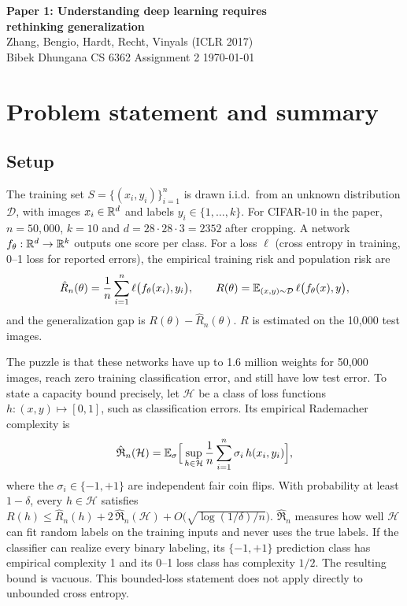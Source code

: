 

\begin{center}
  {\LARGE\bfseries Paper 1: Understanding deep learning requires\\[2pt] rethinking generalization}\\[5pt]
  {\large Zhang, Bengio, Hardt, Recht, Vinyals (ICLR 2017)}\\[4pt]
  Bibek Dhungana \quad\textbar\quad CS 6362 Assignment 2 \quad\textbar\quad \today
\end{center}

\section{Problem statement and summary}

\subsection{Setup}
The training set $S=\{(x_i,y_i)\}_{i=1}^n$ is drawn i.i.d.\ from an unknown distribution $\mathcal D$, with images $x_i\in\mathbb{R}^d$ and labels $y_i\in\{1,\dots,k\}$. For CIFAR-10 in the paper, $n=50{,}000$, $k=10$ and $d=28\cdot28\cdot3=2352$ after cropping. A network $f_\theta:\mathbb{R}^d\to\mathbb{R}^k$ outputs one score per class. For a loss $\ell$ (cross entropy in training, 0--1 loss for reported errors), the empirical training risk and population risk are
\[
  \hat R_n(\theta)=\frac1n\sum_{i=1}^n \ell\big(f_\theta(x_i),y_i\big),\qquad
  R(\theta)=\mathbb{E}_{(x,y)\sim\mathcal D}\,\ell\big(f_\theta(x),y\big),
\]
and the generalization gap is $R(\theta)-\hat R_n(\theta)$. $R$ is estimated on the 10{,}000 test images.

The puzzle is that these networks have up to 1.6 million weights for 50{,}000 images, reach zero training classification error, and still have low test error. To state a capacity bound precisely, let $\mathcal H$ be a class of loss functions $h:(x,y)\mapsto[0,1]$, such as classification errors. Its empirical Rademacher complexity is
\[
  \hat{\mathfrak R}_n(\mathcal H)=\mathbb{E}_{\sigma}\Big[\sup_{h\in\mathcal H}\frac1n\sum_{i=1}^n\sigma_i\,h(x_i,y_i)\Big],
\]
where the $\sigma_i\in\{-1,+1\}$ are independent fair coin flips. With probability at least $1-\delta$, every $h\in\mathcal H$ satisfies $R(h)\le\hat R_n(h)+2\,\hat{\mathfrak R}_n(\mathcal H)+O\big(\sqrt{\log(1/\delta)/n}\big)$. $\hat{\mathfrak R}_n$ measures how well $\mathcal H$ can fit random labels on the training inputs and never uses the true labels. If the classifier can realize every binary labeling, its $\{-1,+1\}$ prediction class has empirical complexity 1 and its 0--1 loss class has complexity $1/2$. The resulting bound is vacuous. This bounded-loss statement does not apply directly to unbounded cross entropy.

